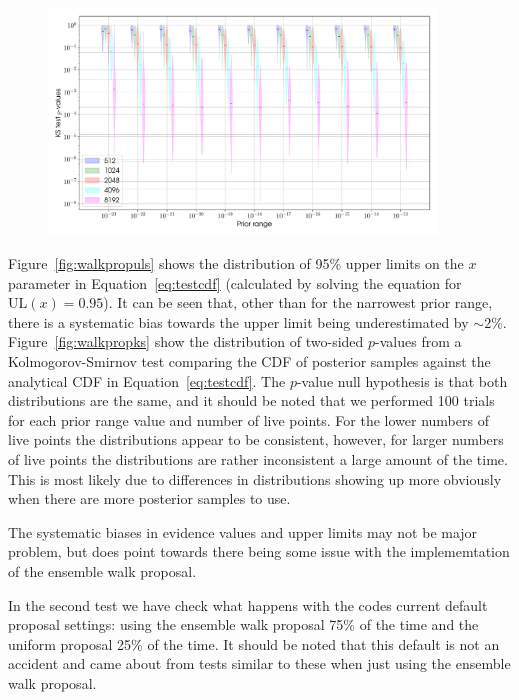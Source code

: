 \begin{figure}[phtb]
\begin{center}
\includegraphics[width=0.92\textwidth]{./figures/proptesting/walk_prop/kstest/collate_plots_wp_ks}
\caption{ \protect}
\end{center}
\end{figure}

Figure~\ref{fig:walkpropuls} shows the distribution of 95\% upper limits on the $x$ parameter in Equation~\ref{eq:testcdf} (calculated by solving
the equation for $\text{UL}(x) = 0.95$). It can be seen that, other than for the narrowest prior range, there is a systematic bias towards the
upper limit being underestimated by $\sim 2\%$. Figure~\ref{fig:walkpropks} show the distribution of two-sided $p$-values from a Kolmogorov-Smirnov
test comparing the CDF of posterior samples against the analytical CDF in Equation~\ref{eq:testcdf}. The $p$-value null hypothesis is that both
distributions are the same, and it should be noted that we performed 100 trials for each prior range value and number of live points. For the
lower numbers of live points the distributions appear to be consistent, however, for larger numbers of live points the distributions are rather
inconsistent a large amount of the time. This is most likely due to differences in distributions showing up more obviously when there are more
posterior samples to use.

The systematic biases in evidence values and upper limits may not be major problem, but does point towards there being some issue with the
implememtation of the ensemble walk proposal.

In the second test we have check what happens with the codes current default proposal settings: using the ensemble walk proposal 75\%
of the time and the uniform proposal 25\% of the time. It should be noted that this default is not an accident and came about from tests
similar to these when just using the ensemble walk proposal.

